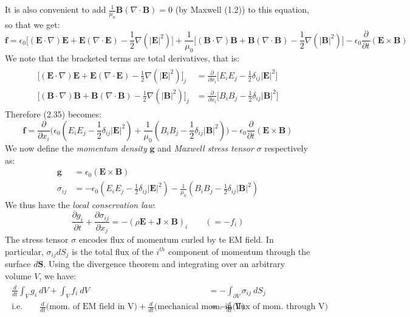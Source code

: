 \documentclass[a4paper]{article}
\numberwithin{equation}{section}
\begin{document}
It is also convenient to add $\frac{1}{\mu_0} \mathbf{B} (\nabla \cdot \mathbf{B})=0$ (by Maxwell (1.2)) to this equation, so that we get:
\begin{equation}
\mathbf{f}= \epsilon_0\big[(\mathbf{E}\cdot \nabla)\mathbf{E}+\mathbf{E}(\nabla \cdot \mathbf{E})-\frac{1}{2}\nabla(|\mathbf{E}|^2)\big]+\frac{1}{\mu_0}\big[(\mathbf{B}\cdot \nabla)\mathbf{B}+\mathbf{B}(\nabla \cdot \mathbf{B})-\frac{1}{2}\nabla(|\mathbf{B}|^2)\big]-\epsilon_0 \frac{\partial}{\partial t}(\mathbf{E}\times \mathbf{B})
\end{equation}
We note that the bracketed terms are total derivatives, that is:
\begin{align}
\begin{split}
[(\mathbf{E}\cdot \nabla)\mathbf{E}+\mathbf{E}(\nabla \cdot \mathbf{E})-\frac{1}{2}\nabla(|\mathbf{E}|^2)\big]_j &= \frac{\partial}{\partial x_i} \big[E_iE_j - \frac{1}{2} \delta_{ij} |\mathbf{E}|^2 \big] \\
[(\mathbf{B}\cdot \nabla)\mathbf{B}+\mathbf{B}(\nabla \cdot \mathbf{B})-\frac{1}{2}\nabla(|\mathbf{B}|^2)\big]_j &= \frac{\partial}{\partial x_i} \big[B_iB_j - \frac{1}{2} \delta_{ij} |\mathbf{B}|^2 \big]
\end{split}
\end{align}
Therefore (2.35) becomes:
\begin{equation}
\mathbf{f}=\frac{\partial}{\partial x_i} \bigg(\epsilon_0(E_iE_j - \frac{1}{2} \delta_{ij} |\mathbf{E}|^2)+\frac{1}{\mu_0}(B_iB_j - \frac{1}{2}\delta_{ij}|\mathbf{B}|^2) \bigg) - \epsilon_0 \frac{\partial}{\partial t}(\mathbf{E} \times \mathbf{B})
\end{equation}
We now define the \textit{momentum density} $\mathbf{g}$ and \textit{Maxwell stress tensor} $\sigma$ respectively as:
\begin{align}
\mathbf{g}&=\epsilon_0 (\mathbf{E}\times \mathbf{B}) \\
\sigma_{ij} &= -\epsilon_0(E_iE_j - \frac{1}{2} \delta_{ij} |\mathbf{E}|^2)-\frac{1}{\mu_0}(B_iB_j - \frac{1}{2}\delta_{ij}|\mathbf{B}|^2)
\end{align}
We thus have the \textit{local conservation law}:
\begin{equation}
\frac{\partial g_i}{\partial t} + \frac{\partial \sigma_{ij}}{\partial x_j} = -(\rho \mathbf{E}+\mathbf{J} \times \mathbf{B})_i \qquad (=-f_i)
\end{equation}
The stress tensor $\sigma$ encodes flux of momentum curled by te EM field. In particular, $\sigma_{ij}dS_j$ is the total flux of the $i^{th}$ component of momentum through the surface $d\mathbf{S}$. Using the divergence theorem and integrating over an arbitrary volume $V$, we have:
\begin{align}
\begin{split}
\frac{d}{dt}\int_V g_i \ dV + \int_V f_i \ dV &= - \int_{\partial V} \sigma_{ij} \ dS_j \\
\text{i.e.} \qquad \frac{d}{dt} \text{(mom. of EM field in V)}+\frac{d}{dt} \text{(mechanical mom. in V)} &= -\frac{d}{dt} \text{(flux of mom. through V)}
\end{split}
\end{align}
\end{document}
